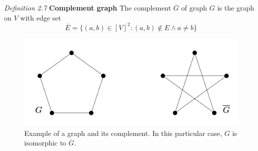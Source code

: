 \documentclass[10pt,a4paper]{book}
\numberwithin{equation}{chapter}
\numberwithin{figure}{chapter}
\numberwithin{table}{chapter}
\begin{document}
\textit{Definition 2.7} \textbf{Complement graph} The complement $\overline{G}$ of graph $G$ is the graph on $V$ with edge set
\begin{equation}
\overline{E}=\lbrace (a,b)\in [V]^{2}:(a,b)\not\in E \wedge a\neq b\rbrace
\end{equation}

\begin{figure}[H]
    \begin{center}
        \includegraphics[scale=0.5]{Imagen2.png}
    \end{center}
    \caption{\footnotesize Example of a graph and its complement. In this particular case, $G$ is isomorphic to $\overline{G}$.}
    \label{fig2}
\end{figure}
\end{document}
